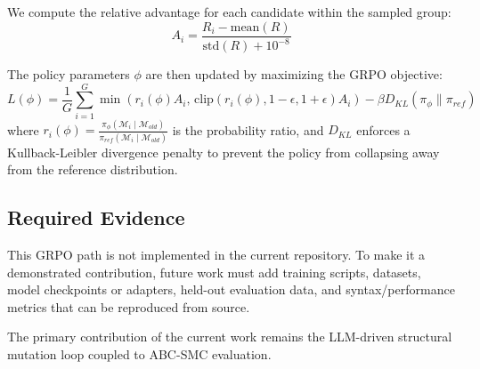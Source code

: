 We compute the relative advantage for each candidate within the sampled group:
\begin{equation}
    A_i = \frac{R_i - \text{mean}(R)}{\text{std}(R) + 10^{-8}}
\end{equation}

The policy parameters $\phi$ are then updated by maximizing the GRPO objective:
\begin{equation}
    L(\phi) = \frac{1}{G} \sum_{i=1}^{G} \min \left( r_i(\phi) A_i, \, \text{clip}(r_i(\phi), 1-\epsilon, 1+\epsilon) A_i \right) - \beta D_{KL}(\pi_\phi \parallel \pi_{ref})
\end{equation}
where $r_i(\phi) = \frac{\pi_\phi(\mathcal{M}_i \mid \mathcal{M}_{old})}{\pi_{ref}(\mathcal{M}_i \mid \mathcal{M}_{old})}$ is the probability ratio, and $D_{KL}$ enforces a Kullback-Leibler divergence penalty to prevent the policy from collapsing away from the reference distribution.

\subsection{Required Evidence}
This GRPO path is not implemented in the current repository. To make it a demonstrated contribution, future work must add training scripts, datasets, model checkpoints or adapters, held-out evaluation data, and syntax/performance metrics that can be reproduced from source.

The primary contribution of the current work remains the LLM-driven structural mutation loop coupled to ABC-SMC evaluation.
